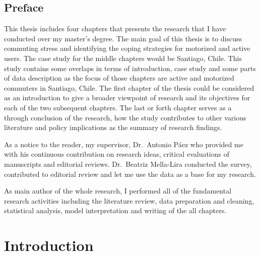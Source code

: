 \documentclass[
11pt, %
oneside, %
english, %
singlespacing, %
]{macthesis} %
\begin{document}
\section*{Preface}
  This thesis includes four chapters that presents the research that I have conducted over my master's degree. The main goal of this thesis is to discuss commuting stress and identifying the coping strategies for motorized and active users. The case study for the middle chapters would be Santiago, Chile. This study contains some overlaps in terms of introduction, case study and some parts of data description as the focus of those chapters are active and motorized commuters in Santiago, Chile. The first chapter of the thesis could be considered as an introduction to give a broader viewpoint of research and its objectives for each of the two subsequent chapters. The last or forth chapter serves as a through conclusion of the research, how the study contributes to other various literature and policy implications as the summary of research findings.

  As a notice to the reader, my supervisor, Dr.~Antonio Páez who provided me with his continuous contribution on research ideas, critical evaluations of manuscripts and editorial reviews. Dr.~Beatriz Mella-Lira conducted the survey, contributed to editorial review and let me use the data as a base for my research.

  As main author of the whole research, I performed all of the fundamental research activities including the literature review, data preparation and cleaning, statistical analysis, model interpretation and writing of the all chapters.
\clearpage

{
\hypersetup{linkcolor=black}
\tableofcontents %

\listoffigures %

\listoftables %

}

\mainmatter %
\pagestyle{thesis}
\hypertarget{introduction}{%
\chapter{Introduction}\label{introduction}}
\end{document}
